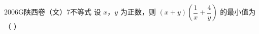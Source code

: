 
\begin{problem}{2006}{G}{陕西卷（文）}{7}{不等式}
设 $ x $，$ y $ 为正数，则 $ (x + y)\left( \dfrac{1}{x} + \dfrac{4}{y} \right) $ 的最小值为 （ ）
\begin{choices}
\end{choices}
\end{problem}

\begin{answer}

\end{answer}

\begin{solutions}

\end{solutions}